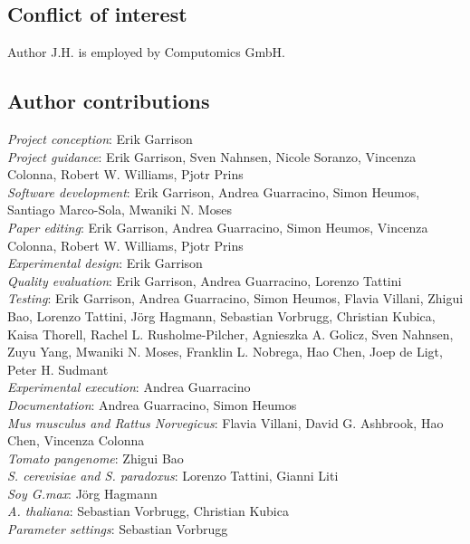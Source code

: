 \documentclass[pdflatex,mathphys]{jnl}%
\theoremstyle{thmstyleone}%
\theoremstyle{thmstyletwo}%
\theoremstyle{thmstylethree}%
\begin{document}
\subsection*{Conflict of interest}

Author J.H. is employed by Computomics GmbH.

\subsection*{Author contributions}

\emph{Project conception}: Erik Garrison \\ 
\emph{Project guidance}: Erik Garrison, Sven Nahnsen, Nicole Soranzo, Vincenza Colonna, Robert W. Williams, Pjotr Prins \\ 
\emph{Software development}: Erik Garrison, Andrea Guarracino, Simon Heumos, Santiago Marco-Sola, Mwaniki N. Moses \\ 
\emph{Paper editing}: Erik Garrison, Andrea Guarracino, Simon Heumos, Vincenza Colonna, Robert W. Williams, Pjotr Prins \\ 
\emph{Experimental design}: Erik Garrison \\ 
\emph{Quality evaluation}: Erik Garrison, Andrea Guarracino, Lorenzo Tattini \\ 
\emph{Testing}: Erik Garrison, Andrea Guarracino, Simon Heumos, Flavia Villani, Zhigui Bao, Lorenzo Tattini, J\"{o}rg Hagmann, Sebastian Vorbrugg, Christian Kubica, Kaisa Thorell, Rachel L. Rusholme-Pilcher, Agnieszka A. Golicz, Sven Nahnsen, Zuyu Yang, Mwaniki N. Moses, Franklin L. Nobrega, Hao Chen, Joep de Ligt, Peter H. Sudmant \\ 
\emph{Experimental execution}: Andrea Guarracino \\ 
\emph{Documentation}: Andrea Guarracino, Simon Heumos \\ 
\emph{Mus musculus and Rattus Norvegicus}: Flavia Villani, David G. Ashbrook, Hao Chen, Vincenza Colonna \\ 
\emph{Tomato pangenome}: Zhigui Bao \\ 
\emph{S. cerevisiae and S. paradoxus}: Lorenzo Tattini, Gianni Liti \\ 
\emph{Soy G.max}: J\"{o}rg Hagmann \\ 
\emph{A. thaliana}: Sebastian Vorbrugg, Christian Kubica \\ 
\emph{Parameter settings}: Sebastian Vorbrugg \\ 
\end{document}

